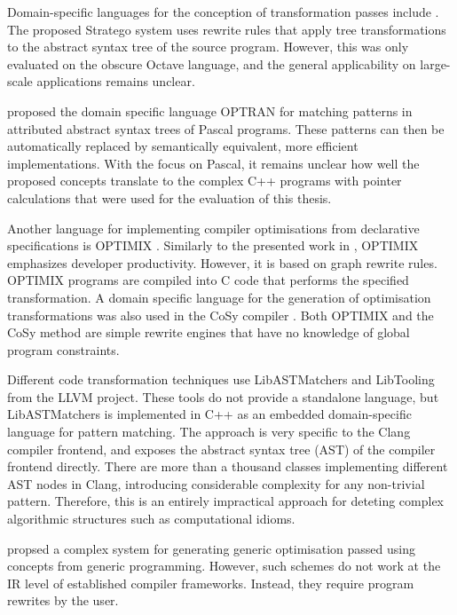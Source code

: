     Domain-specific languages for the conception of transformation passes
    include \citet{Olmos:2005:CSD:2136624.2136643}.
    The proposed Stratego system uses rewrite rules that apply tree
    transformations to the abstract syntax tree of the source program.
    However, this was only evaluated on the obscure Octave language, and the
    general applicability on large-scale applications remains unclear.

    \citet{Lipps1989} proposed the domain specific language OPTRAN for matching
    patterns in attributed abstract syntax trees of Pascal programs.
    These patterns can then be automatically replaced by semantically
    equivalent, more efficient implementations.
    With the focus on Pascal, it remains unclear how well the proposed concepts
    translate to the complex C++ programs with pointer calculations that were
    used for the evaluation of this thesis.

    Another language for implementing compiler optimisations from
    declarative specifications is OPTIMIX \citep{Assmann1996,Assmann98optimix}.
    Similarly to the presented work in , OPTIMIX emphasizes
    developer productivity.
    However, it is based on graph rewrite rules.
    OPTIMIX programs are compiled into C code that performs the specified
    transformation.
    A domain specific language for the generation of optimisation
    transformations was also used in the CoSy compiler \citep{Alt1994}.
    Both OPTIMIX and the CoSy method are simple rewrite engines that have no
    knowledge of global program constraints.

    Different code transformation techniques use LibASTMatchers
    and LibTooling \citep{be0fa11ddb194bde86a9dab8589b779c} from the
    LLVM project.
    These tools do not provide a standalone language, but LibASTMatchers is
    implemented in C++ as an embedded domain-specific language for pattern
    matching.
    The approach is very specific to the Clang compiler frontend, and exposes
    the abstract syntax tree (AST) of the compiler frontend directly.
    There are more than a thousand classes implementing different AST nodes in
    Clang, introducing considerable complexity for any non-trivial pattern.
    Therefore, this is an entirely impractical approach for deteting complex
    algorithmic structures such as computational idioms.

    \citet{Willcock:2009:RGP:1621607.1621611} propsed a complex system for
    generating generic optimisation passed using concepts from generic
    programming.
    However, such schemes do not work at the IR level of established
    compiler frameworks.
    Instead, they require program rewrites by the user.

